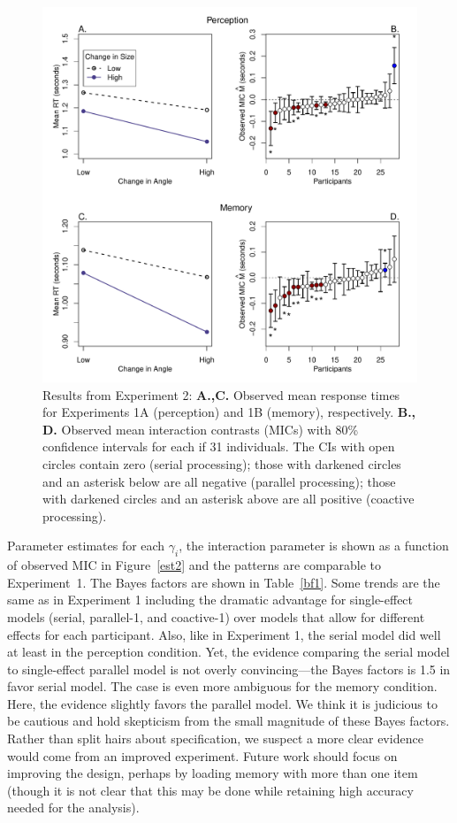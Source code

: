 \documentclass[fignum,nobf,man]{apa}
\begin{document}
\begin{figure}
\centering
\includegraphics[width=6in]{jonFigures/jE2.pdf}
\caption{Results from Experiment 2:  {\bf A.,C.} Observed mean response times for Experiments 1A (perception) and 1B (memory), respectively.  {\bf B., D.} Observed mean interaction contrasts (MICs) with 80\% confidence intervals for each if 31 individuals.  The CIs with open circles contain zero (serial processing); those with darkened circles and an asterisk below are all negative (parallel processing); those with darkened circles and an asterisk above are all positive (coactive processing).}
\label{surf2}
\end{figure}

Parameter estimates for each $\gamma_i$, the interaction parameter is shown as a function of observed MIC in Figure~\ref{est2} and the patterns are comparable to Experiment~1.  The Bayes factors are shown in Table~\ref{bf1}.  Some trends are the same as in Experiment 1 including the dramatic advantage for single-effect models (serial, parallel-1, and coactive-1) over models that allow for different effects for each participant.  Also, like in Experiment 1, the serial model did well at least in the perception condition.  Yet, the evidence comparing the serial model to single-effect parallel model is not overly convincing---the Bayes factors is 1.5 in favor serial model.  The case is even more ambiguous for the memory condition.  Here, the evidence slightly favors the parallel model.   We think it is judicious to be cautious and hold skepticism from the small magnitude of these Bayes factors.  Rather than split hairs about specification, we suspect a more clear evidence would come from an improved experiment.  Future work should focus on improving the design, perhaps by loading memory with more than one item (though it is not clear that this may be done while retaining high accuracy needed for the analysis).
\end{document}
